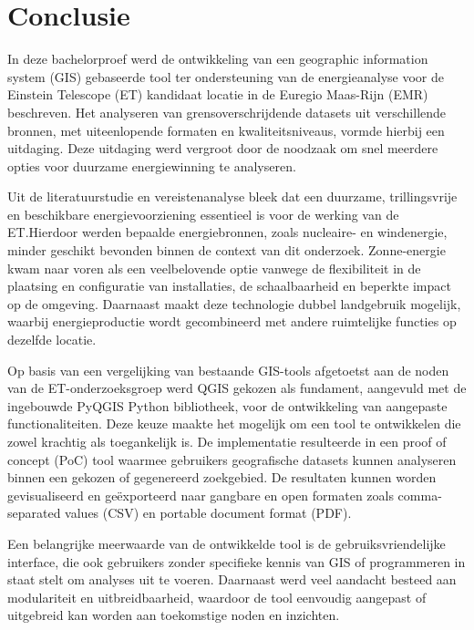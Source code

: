 
\chapter{Conclusie}\label{ch:conclusie}

In deze bachelorproef werd de ontwikkeling van een geographic information system (GIS) gebaseerde tool ter ondersteuning van de energieanalyse voor de Einstein Telescope (ET) kandidaat locatie in de Euregio Maas-Rijn (EMR) beschreven. Het analyseren van grensoverschrijdende datasets uit verschillende bronnen, met uiteenlopende formaten en kwaliteitsniveaus, vormde hierbij een uitdaging. Deze uitdaging werd vergroot door de noodzaak om snel meerdere opties voor duurzame energiewinning te analyseren.\medskip

Uit de literatuurstudie en vereistenanalyse bleek dat een duurzame, trillingsvrije en beschikbare energievoorziening essentieel is voor de werking van de ET.\@ Hierdoor werden bepaalde energiebronnen, zoals nucleaire- en windenergie, minder geschikt bevonden binnen de context van dit onderzoek. Zonne-energie kwam naar voren als een veelbelovende optie vanwege de flexibiliteit in de plaatsing en configuratie van installaties, de schaalbaarheid en beperkte impact op de omgeving. Daarnaast maakt deze technologie dubbel landgebruik mogelijk, waarbij energieproductie wordt gecombineerd met andere ruimtelijke functies op dezelfde locatie.\medskip

Op basis van een vergelijking van bestaande GIS-tools afgetoetst aan de noden van de ET-onderzoeksgroep werd QGIS gekozen als fundament, aangevuld met de ingebouwde PyQGIS Python bibliotheek, voor de ontwikkeling van aangepaste functionaliteiten. Deze keuze maakte het mogelijk om een tool te ontwikkelen die zowel krachtig als toegankelijk is. De implementatie resulteerde in een proof of concept (PoC) tool waarmee gebruikers geografische datasets kunnen analyseren binnen een gekozen of gegenereerd zoekgebied. De resultaten kunnen worden gevisualiseerd en geëxporteerd naar gangbare en open formaten zoals comma-separated values (CSV) en portable document format (PDF).\medskip

Een belangrijke meerwaarde van de ontwikkelde tool is de gebruiksvriendelijke interface, die ook gebruikers zonder specifieke kennis van GIS of programmeren in staat stelt om analyses uit te voeren. Daarnaast werd veel aandacht besteed aan modulariteit en uitbreidbaarheid, waardoor de tool eenvoudig aangepast of uitgebreid kan worden aan toekomstige noden en inzichten.\medskip

